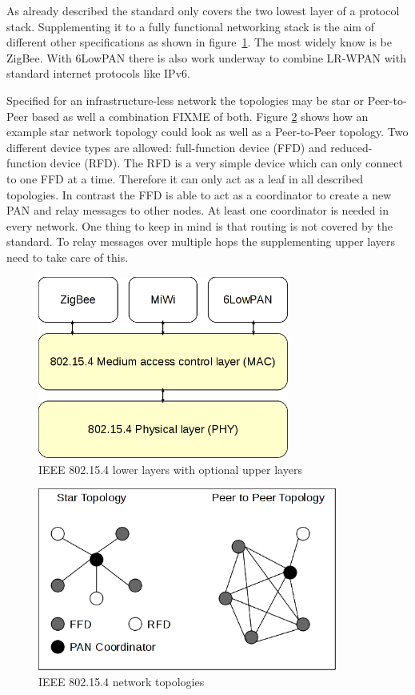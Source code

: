 As already described the standard only covers the two lowest layer of a
protocol stack. Supplementing it to a fully functional networking stack is the aim
of different other specifications as shown in figure~\ref{fig:802154layer}. The
most widely know is be ZigBee. With 6LowPAN there is also work underway to combine
LR-WPAN with standard internet protocols like IPv6.

Specified for an infrastructure-less network the topologies may be star or
Peer-to-Peer based as well a combination FIXME of both. Figure \ref{fig:802154topologies}
shows how an example star network topology could look as well as a Peer-to-Peer
topology. Two different device types are allowed: full-function device (FFD) and
reduced-function device (RFD). The RFD is a very simple device which can only
connect to one FFD at a time. Therefore it can only act as a leaf in all
described topologies. In contrast the FFD is able to act as a coordinator to
create a new PAN and relay messages to other nodes. At least one coordinator
is needed in every network. One thing to keep in mind is that routing is not
covered by the standard. To relay messages over multiple hops the supplementing
upper layers need to take care of this.

\begin{figure}
  \begin{center}
    \includegraphics[height=6cm]{images/802154layer}
    \caption{IEEE 802.15.4 lower layers with optional upper layers}
        \label{fig:802154layer}
  \end{center}
\end{figure}

\begin{figure}
  \begin{center}
    \includegraphics[height=6cm]{images/802154topology}
    \caption{IEEE 802.15.4 network topologies}
        \label{fig:802154topologies}
  \end{center}
\end{figure}

